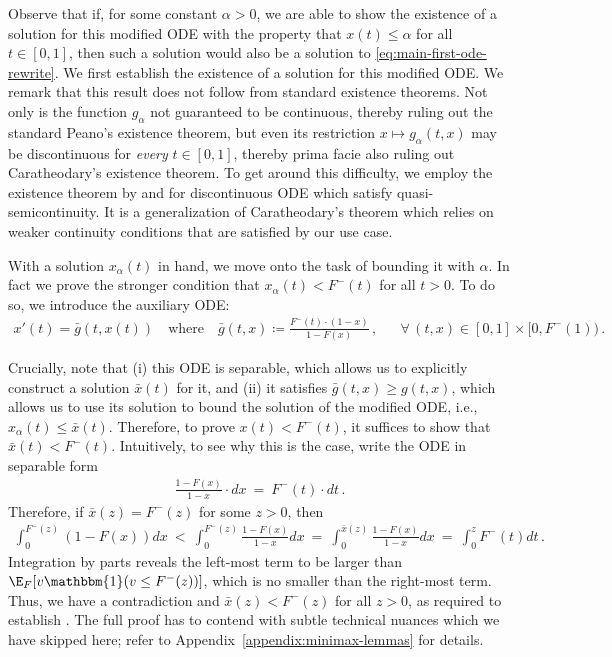 Observe that if, for some constant $\alpha > 0$, we are able to show the existence of a solution for this modified ODE with the property that $x(t) \leq \alpha$ for all $t \in [0,1]$, then such a solution would also be a solution to \eqref{eq:main-first-ode-rewrite}. We first establish the existence of a solution for this modified ODE. We remark that this result does not follow from standard existence theorems. Not only is the function $g_{\alpha}$ not guaranteed to be continuous, thereby ruling out the standard Peano's existence theorem, but even its restriction $x \mapsto g_\alpha(t,x)$ may be discontinuous for \emph{every} $t \in [0,1]$, thereby prima facie also ruling out Caratheodary's existence theorem. To get around this difficulty, we employ the existence theorem by \citet{biles1997caratheodory} and \citet{biles2000solvability} for discontinuous ODE which satisfy quasi-semicontinuity. It is a generalization of Caratheodary's theorem which relies on weaker continuity conditions that are satisfied by our use case.

With a solution $x_\alpha(t)$ in hand, we move onto the task of bounding it with $\alpha$. In fact we prove the stronger condition that $x_\alpha(t) < F^-(t)$ for all $t > 0$. To do so, we introduce the auxiliary ODE:
\begin{align*}
    x'(t) = \bar g(t,x(t)) \quad \text{where}\quad \bar g(t,x) \coloneqq \frac{F^-(t) \cdot (1 -x)}{1 - F(x)}\,, && \forall \,(t,x) 
    \in [0,1] \times [0,F^{-}(1))\,.
\end{align*}

Crucially, note that (i) this ODE is separable, which allows us to explicitly construct a solution $\bar x(t)$ for it, and (ii) it satisfies $\bar g(t, x) \geq g(t,x)$, which allows us to use its solution to bound the solution of the modified ODE, i.e., $x_\alpha(t) \leq \bar x(t)$. Therefore, to prove $x(t) < F^-(t)$, it suffices to show that $\bar x(t) < F^-(t)$. Intuitively, to see why this is the case, write the ODE in separable form
\begin{align*}
    \frac{1 - F(x)}{1 -x} \cdot dx\ =\ F^-(t) \cdot dt\,.
\end{align*}
Therefore, if $\bar x(z) =  F^-(z)$ for some $z > 0$, then
\begin{align*}
    \int_0^{F^-(z)} (1 - F(x)) dx\ <\ \int_0^{F^-(z)} \frac{1 - F(x)}{1 - x} dx\ =\ \int_0^{\bar x(z)} \frac{1 - F(x)}{1 - x} dx\ =\  \int_0^z F^-(t) dt\,.
\end{align*}
Integration by parts reveals the left-most term to be larger than $\E_F[v \mathbbm{1}(v \leq F^-(z))]$, which is no smaller than the right-most term. Thus, we have a contradiction and $\bar x(z) <  F^-(z)$ for all $z > 0$, as required to establish . The full proof has to contend with subtle technical nuances which we have skipped here; refer to Appendix~\ref{appendix:minimax-lemmas} for details.





